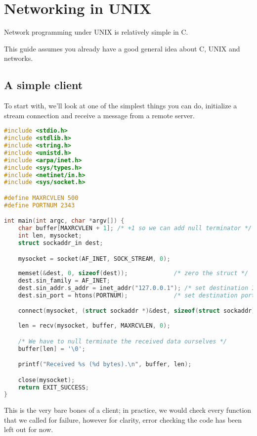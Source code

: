 \section{Networking in UNIX}
Network programming under UNIX is relatively simple in C.

This guide assumes you already have a good general idea about C, UNIX and
networks.

\subsection{A simple client}
To start with, we'll look at one of the simplest things you can do, initialize
a stream connection and receive a message from a remote server.
\lstset{basicstyle=\scriptsize, numbers=left, captionpos=b, tabsize=4}
\begin{lstlisting}[caption=Section \thesection listing \arabic{netcnt},language={C},
breaklines=true,xleftmargin=15pt,label=lst:section\thesection listing\arabic{netcnt}]
#include <stdio.h>
#include <stdlib.h>
#include <string.h>
#include <unistd.h>
#include <arpa/inet.h>
#include <sys/types.h>
#include <netinet/in.h>
#include <sys/socket.h>

#define MAXRCVLEN 500
#define PORTNUM 2343

int main(int argc, char *argv[]) {
	char buffer[MAXRCVLEN + 1]; /* +1 so we can add null terminator */
	int len, mysocket;
	struct sockaddr_in dest; 

	mysocket = socket(AF_INET, SOCK_STREAM, 0);
 
	memset(&dest, 0, sizeof(dest));				/* zero the struct */
	dest.sin_family = AF_INET;
	dest.sin_addr.s_addr = inet_addr("127.0.0.1"); /* set destination IP number */ 
	dest.sin_port = htons(PORTNUM);				/* set destination port number */

	connect(mysocket, (struct sockaddr *)&dest, sizeof(struct sockaddr));
 
	len = recv(mysocket, buffer, MAXRCVLEN, 0);

	/* We have to null terminate the received data ourselves */
	buffer[len] = '\0';

	printf("Received %s (%d bytes).\n", buffer, len);

	close(mysocket);
	return EXIT_SUCCESS;
}
\end{lstlisting}

This is the very bare bones of a client; in practice, we would check every
function that we called for failure, however for clarity, error checking the
code has been left out for now.

